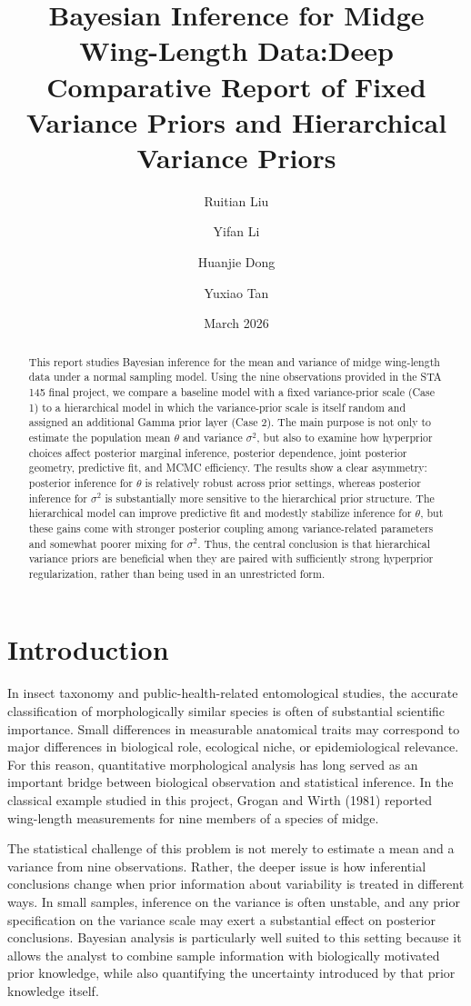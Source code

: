 \documentclass[11pt]{article}
\title{Bayesian Inference for Midge Wing-Length Data:\A Deep Comparative Report of Fixed Variance Priors and Hierarchical Variance Priors}
\author{Ruitian Liu \and Yifan Li \and Huanjie Dong \and Yuxiao Tan}
\date{March 2026}
\begin{document}
\maketitle
\begin{abstract}
This report studies Bayesian inference for the mean and variance of midge wing-length data under a normal sampling model. Using the nine observations provided in the STA 145 final project, we compare a baseline model with a fixed variance-prior scale (Case 1) to a hierarchical model in which the variance-prior scale is itself random and assigned an additional Gamma prior layer (Case 2). The main purpose is not only to estimate the population mean $\theta$ and variance $\sigma^2$, but also to examine how hyperprior choices affect posterior marginal inference, posterior dependence, joint posterior geometry, predictive fit, and MCMC efficiency. The results show a clear asymmetry: posterior inference for $\theta$ is relatively robust across prior settings, whereas posterior inference for $\sigma^2$ is substantially more sensitive to the hierarchical prior structure. The hierarchical model can improve predictive fit and modestly stabilize inference for $\theta$, but these gains come with stronger posterior coupling among variance-related parameters and somewhat poorer mixing for $\sigma^2$. Thus, the central conclusion is that hierarchical variance priors are beneficial when they are paired with sufficiently strong hyperprior regularization, rather than being used in an unrestricted form.
\end{abstract}

\section{Introduction}

In insect taxonomy and public-health-related entomological studies, the accurate classification of morphologically similar species is often of substantial scientific importance. Small differences in measurable anatomical traits may correspond to major differences in biological role, ecological niche, or epidemiological relevance. For this reason, quantitative morphological analysis has long served as an important bridge between biological observation and statistical inference. In the classical example studied in this project, Grogan and Wirth (1981) reported wing-length measurements for nine members of a species of midge. 

The statistical challenge of this problem is not merely to estimate a mean and a variance from nine observations. Rather, the deeper issue is how inferential conclusions change when prior information about variability is treated in different ways. In small samples, inference on the variance is often unstable, and any prior specification on the variance scale may exert a substantial effect on posterior conclusions. Bayesian analysis is particularly well suited to this setting because it allows the analyst to combine sample information with biologically motivated prior knowledge, while also quantifying the uncertainty introduced by that prior knowledge itself.
\end{document}
